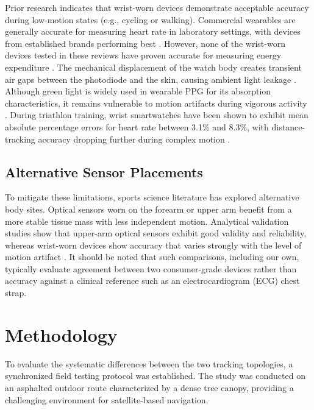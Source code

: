 \documentclass{acmsiggraph}
\begin{document}
	Prior research indicates that wrist-worn devices demonstrate acceptable
	accuracy during low-motion states (e.g., cycling or walking). Commercial
	wearables are generally accurate for measuring heart rate in laboratory
	settings, with devices from established brands performing best
	\cite{fuller_reliability_2020}. However, none of the wrist-worn devices tested in
	these reviews have proven accurate for measuring energy expenditure
	\cite{fuller_reliability_2020,germini_accuracy_2022}. The mechanical displacement of the watch
	body creates transient air gaps between the photodiode and the skin,
	causing ambient light leakage \cite{kim_photoplethysmography_2023}. Although green light is
	widely used in wearable PPG for its absorption characteristics, it
	remains vulnerable to motion artifacts during vigorous activity
	\cite{kim_photoplethysmography_2023}. During triathlon training, wrist smartwatches have been
	shown to exhibit mean absolute percentage errors for heart rate between
	3.1\% and 8.3\%, with distance-tracking accuracy dropping further during
	complex motion \cite{jacko_validity_2024}.
	
	\subsection{Alternative Sensor Placements}
	
	To mitigate these limitations, sports science literature has explored
	alternative body sites. Optical sensors worn on the forearm or upper arm
	benefit from a more stable tissue mass with less independent motion.
	Analytical validation studies show that upper-arm optical sensors exhibit
	good validity and reliability, whereas wrist-worn devices show accuracy
	that varies strongly with the level of motion artifact
	\cite{schweizer2024heart}. It should be noted that such comparisons, including
	our own, typically evaluate agreement between two consumer-grade devices
	rather than accuracy against a clinical reference such as an
	electrocardiogram (ECG) chest strap.
	
	\section{Methodology}
	
	To evaluate the systematic differences between the two tracking
	topologies, a synchronized field testing protocol was established. The
	study was conducted on an asphalted outdoor route characterized by a
	dense tree canopy, providing a challenging environment for
	satellite-based navigation.
	
\end{document}
